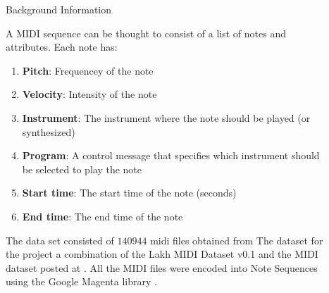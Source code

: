 \documentclass[final]{beamer}
\newlength{\sepwid}
\newlength{\onecolwid}
\newlength{\twocolwid}
\begin{document}
\begin{frame}[t]
\begin{columns}[t]
\begin{column}{\onecolwid}

\begin{block}{Background Information}

A MIDI sequence can be thought to consist of a list of notes and attributes. Each note has:

\begin{enumerate}
\item \textbf{Pitch}: Frequencey of the note
\item \textbf{Velocity}: Intensity of the note
\item \textbf{Instrument}: The instrument where the note should be played (or synthesized) 
\item \textbf{Program}: A control message that specifies which instrument should be selected to play the note
\item \textbf{Start time}: The start time of the note (seconds)
\item \textbf{End time}: The end time of the note          
\end{enumerate}

The data set consisted of $140944$ midi files obtained from The dataset for the project a combination of the Lakh MIDI Dataset v0.1 \cite{colinlmd} and the MIDI dataset posted at \cite{midiman}. All the MIDI files were encoded into Note Sequences using the Google Magenta library
.



\end{block}
\end{column} %


\begin{column}{\sepwid}\end{column} %

\begin{column}{\twocolwid} %

\begin{columns}[t,totalwidth=\twocolwid] %

\begin{column}{\onecolwid}\vspace{-.6in} %





\end{column}
\end{columns}
\end{column}
\end{columns}
\end{frame}
\end{document}
